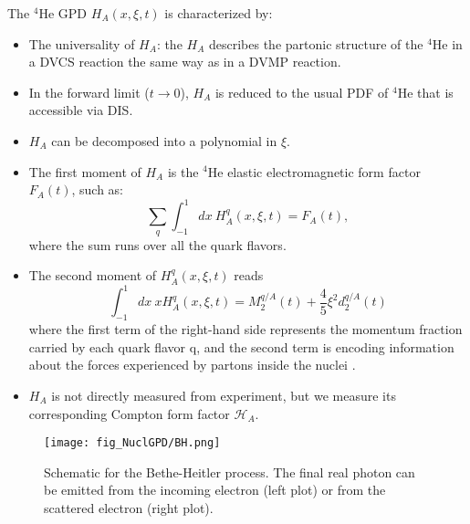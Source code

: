 The $^4$He GPD $H_{A}(x,\xi,t)$ is characterized by:
\begin{itemize}
 \item The universality of $H_{A}$: the $H_{A}$ describes the partonic 
 structure of the $^4$He in a DVCS reaction the same way as in a DVMP reaction.  
 \item In the forward limit ($t\rightarrow 0$), $H_{A}$ is reduced to the usual 
    PDF of $^4$He that is accessible via DIS.
 \item $H_{A}$ can be decomposed into a polynomial in $\xi$.
 \item The first moment of $H_{A}$ is the $^4$He elastic electromagnetic form 
    factor $F_{A}(t)$, such as:
 \begin{equation}
   \sum_{q} \int_{-1}^{1} dx ~H_{A}^{q}(x, \xi, t) =  F_{A}(t),
\end{equation}
  where the sum runs over all the quark flavors.
  \item The second moment of $H_{A}^{q}(x, \xi, t)$ reads
  \begin{equation}
 \int_{-1}^{1} dx ~x H_{A}^{q}(x, \xi, t) = M ^{q/A}_{2}(t) + \frac{4}{5} 
 \xi^{2} d^{q/A}_{2}(t)
  \end{equation}
   where the first term of the right-hand side represents the momentum fraction 
carried by each quark flavor q, and the second term is encoding information 
about the forces experienced by partons inside the nuclei 
\cite{Polyakov:2002yz}.  \item $H_{A}$ is not directly measured from 
experiment, but we measure its corresponding Compton form factor 
$\mathcal{H}_{A}$.  \end{itemize}  



\begin{figure}[tbp]
\centering
\texttt{[image: fig\_NuclGPD/BH.png]}
\caption{Schematic for the Bethe-Heitler process. The final real photon can be  
emitted from the incoming electron (left plot) or from the scattered electron 
(right plot).} 
\label{BH}
\end{figure}

